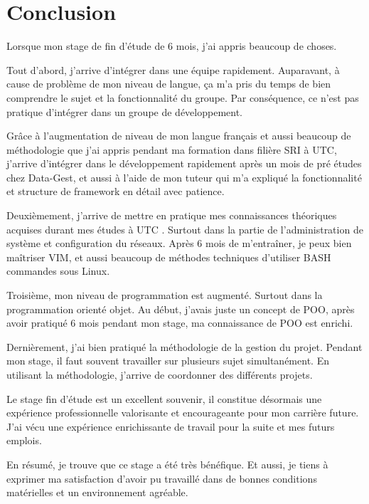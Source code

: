 \chapter{Conclusion}

Lorsque mon stage de fin d'étude de 6 mois, j'ai appris beaucoup de choses.

Tout d'abord, j'arrive d'intégrer dans une équipe rapidement. Auparavant, à cause de problème de mon niveau de langue, ça m'a pris du temps de bien comprendre le sujet et la fonctionnalité du groupe. Par conséquence, ce n'est pas pratique d'intégrer dans un groupe de développement. 

Grâce à l'augmentation de niveau de mon langue français  et aussi beaucoup de méthodologie que j'ai appris pendant ma formation dans filière SRI à UTC, j'arrive d'intégrer dans le développement rapidement après un mois de pré études chez Data-Gest, et aussi à l'aide de mon tuteur qui m'a expliqué la  fonctionnalité et structure de framework en détail avec patience. 

Deuxièmement, j'arrive de  mettre en pratique mes connaissances théoriques acquises durant mes études à UTC . Surtout dans la partie de l'administration de système et configuration du réseaux. Après 6 mois de m'entraîner, je peux bien maîtriser VIM, et aussi beaucoup de méthodes techniques d'utiliser BASH commandes sous Linux.

Troisième, mon niveau de programmation est augmenté. Surtout dans la programmation orienté objet. Au début, j'avais juste un concept de POO, après avoir pratiqué 6 mois pendant mon stage, ma connaissance de POO est enrichi.

Dernièrement, j'ai bien pratiqué la méthodologie de la gestion du projet. Pendant mon stage, il faut souvent travailler sur plusieurs sujet simultanément. En utilisant la méthodologie, j'arrive de coordonner des différents projets. 

Le stage fin d'étude est un excellent souvenir, il constitue désormais une expérience professionnelle valorisante et encourageante pour mon carrière future. J'ai vécu une expérience enrichissante de travail pour la suite et mes futurs emplois. 

En résumé, je trouve que ce stage a été très bénéfique. Et aussi, je tiens à exprimer ma satisfaction d'avoir pu travaillé dans de bonnes conditions matérielles et un environnement agréable.


